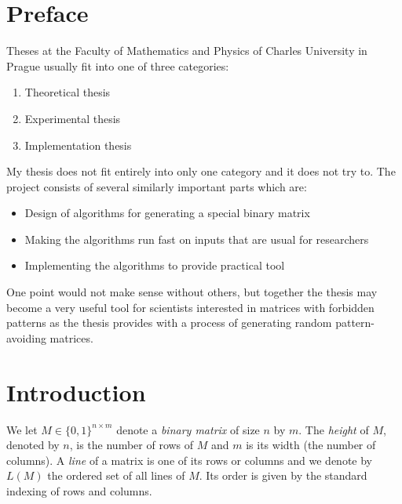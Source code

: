 \chapter*{Preface}
Theses at the Faculty of Mathematics and Physics of Charles University in Prague usually fit into one of three categories:
\begin{enumerate}
\item Theoretical thesis
\item Experimental thesis
\item Implementation thesis
\end{enumerate}
My thesis does not fit entirely into only one category and it does not try to. The project consists of several similarly important parts which are:
\begin{itemize}
\item Design of algorithms for generating a special binary matrix
\item Making the algorithms run fast on inputs that are usual for researchers
\item Implementing the algorithms to provide practical tool
\end{itemize}
One point would not make sense without others, but together the thesis may become a very useful tool for scientists interested in matrices with forbidden patterns as the thesis provides with a process of generating random pattern-avoiding matrices.
\chapter*{Introduction}
We let $M\in\{0,1\}^{n\times m}$ denote a \emph{binary matrix} of size $n$ by $m$. The \emph{height} of $M$, denoted by $n$, is the number of rows of $M$ and $m$ is its width (the number of columns). A \emph{line} of a matrix is one of its rows or columns and we denote by $L(M)$ the ordered set of all lines of $M$. Its order is given by the standard indexing of rows and columns.

